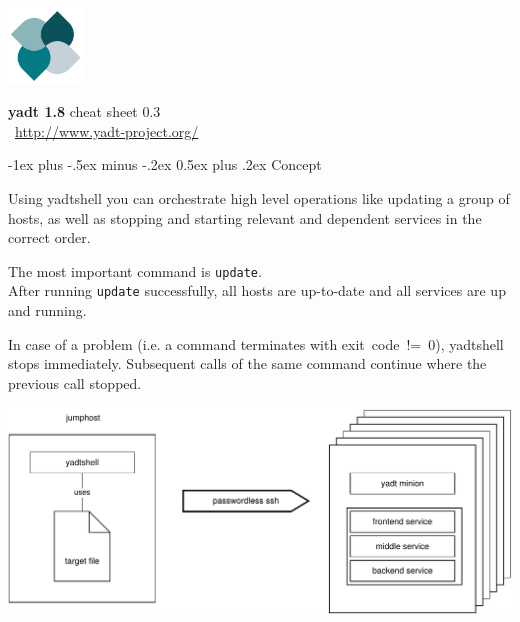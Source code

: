 \documentclass[10pt,landscape]{article}
\makeatletter
\renewcommand{\section}{\@startsection{section}{1}{0mm}%
                                {-1ex plus -.5ex minus -.2ex}%
                                {0.5ex plus .2ex}%
                                {\normalfont\large\bfseries}}
\newcommand{\note}[2][Note]{
\begin{description}[font=\bfseries,leftmargin=1cm,style=sameline]
    \item [{#1}] {#2}
\end{description}
}
\makeatother
\begin{document}
\raggedright
\footnotesize
\begin{multicols}{3}
\raggedcolumns


\setlength{\premulticols}{1pt}
\setlength{\postmulticols}{1pt}
\setlength{\multicolsep}{1em}
\setlength{\columnsep}{1em}

\includegraphics[width=2cm,valign=t]{res/yadtlogo}%
\hfill%
\begin{minipage}[t]{5cm}
{\Large{\textbf{yadt 1.8}}}\hfill
\textcolor{faded}{cheat sheet 0.3}\\[1em]
~\hfill\href{http://www.yadt-project.org/}{http://www.yadt-project.org/}
\end{minipage}


\section{Concept}

Using yadtshell you can orchestrate high level operations like updating
a group of hosts, as well as stopping and starting relevant and dependent
services in the correct order.
\medskip

The most important command is \verb+update+.\\
After running \verb+update+ successfully, all hosts are up-to-date and
all services are up and running.

\note{In case of a problem (i.e. a command terminates with exit~code~!=~0),
yadtshell stops immediately. Subsequent calls of the same command continue
where the previous call stopped.}

\includegraphics[width=\linewidth]{res/concept}


\end{multicols}
\end{document}
